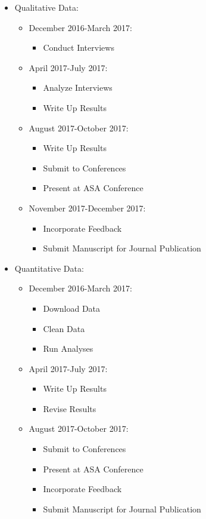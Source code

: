 \documentclass{article}
\begin{document}
\begin{itemize}
\item Qualitative Data: {\color{red}
	\begin{itemize} 
	\item December 2016-March 2017:
		\begin{itemize}
		\item Conduct Interviews
		\end{itemize}
	\item April 2017-July 2017:
		\begin{itemize}
		\item Analyze Interviews
		\item Write Up Results
		\end{itemize}
	\item August 2017-October 2017:
		\begin{itemize}
		\item Write Up Results
		\item Submit to Conferences
		\item Present at ASA Conference
		\end{itemize}
	\item November 2017-December 2017:
		\begin{itemize}
		\item Incorporate Feedback
		\item Submit Manuscript for Journal Publication
		\end{itemize}
	\end{itemize} }
\item Quantitative Data: {\color{red}
	\begin{itemize}
	\item December 2016-March 2017:
		\begin{itemize}
		\item Download Data
		\item Clean Data
		\item Run Analyses
		\end{itemize}
	\item April 2017-July 2017:
		\begin{itemize}
		\item Write Up Results
		\item Revise Results
		\end{itemize}
	\item August 2017-October 2017:
		\begin{itemize}
		\item Submit to Conferences
		\item Present at ASA Conference
		\item Incorporate Feedback
		\item Submit Manuscript for Journal Publication
		\end{itemize}
	\end{itemize} }
\end{itemize}
\end{document}
